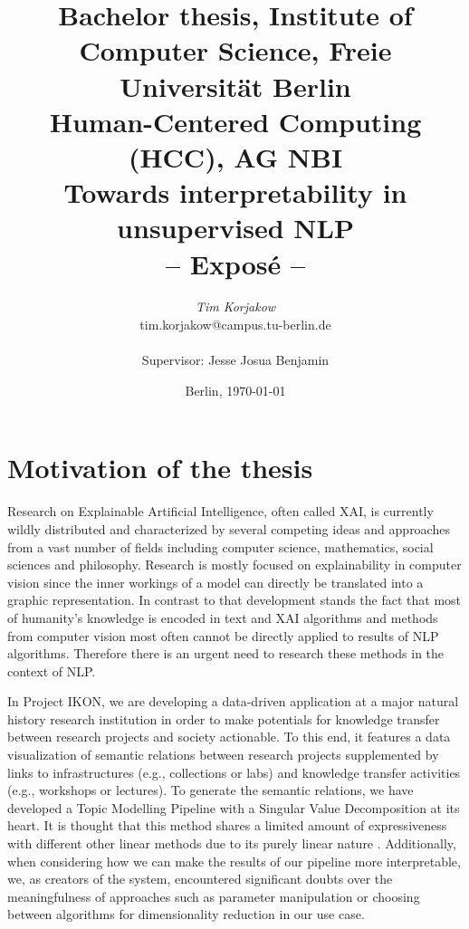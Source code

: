 \documentclass[pdftex,a4paper,12pt]{scrartcl}
\title{
{\small Bachelor thesis, Institute of Computer Science, Freie Universität Berlin}\\
{\small Human-Centered Computing (HCC), AG NBI}\\
[6ex]
{\LARGE Towards interpretability in unsupervised NLP}\\
{\normalsize-- Exposé --}}
\author{
{\emph{\normalsize Tim Korjakow}}\\
{\normalsize tim.korjakow@campus.tu-berlin.de}\\\\
{\normalsize Supervisor: Jesse Josua Benjamin }
}
\date{\normalsize Berlin, \today}
\newcommand{\blankpage}{
\newpage
\thispagestyle{empty}
\mbox{}
\newpage
}
\begin{document}
\maketitle 

\thispagestyle{empty}  %

\blankpage


\setcounter{page}{1} %

\section{Motivation of the thesis} 

Research on Explainable Artificial Intelligence, often called XAI, is currently wildly distributed and characterized by several competing ideas and approaches from a vast number of fields including computer science, mathematics, social sciences and philosophy. Research is mostly focused on explainability in computer vision since the inner workings of a model can directly be translated into a graphic representation. In contrast to that development stands the fact that most of humanity's knowledge is encoded in text and XAI algorithms and methods from computer vision most often cannot be directly applied to results of NLP algorithms. Therefore there is an urgent need to research these methods in the context of NLP.

In Project IKON, we are developing a data-driven application at a major natural history research institution in order to make potentials for knowledge transfer between research projects and society actionable. To this end, it features a data visualization of semantic relations between research projects supplemented by links to infrastructures (e.g., collections or labs) and knowledge transfer activities (e.g., workshops or lectures). To generate the semantic relations, we have developed a Topic Modelling Pipeline with a Singular Value Decomposition at its heart. It is thought that this method shares a limited amount of expressiveness with different other linear methods due to its purely linear nature \cite{arrasWhatRelevantText2017}. Additionally, when considering how we can make the results of our pipeline more interpretable, we, as creators of the system, encountered significant doubts over the meaningfulness of approaches such as parameter manipulation or choosing between algorithms for dimensionality reduction \cite{benjaminTransparencyMediationMeaning2018} in our use case.
\end{document}
